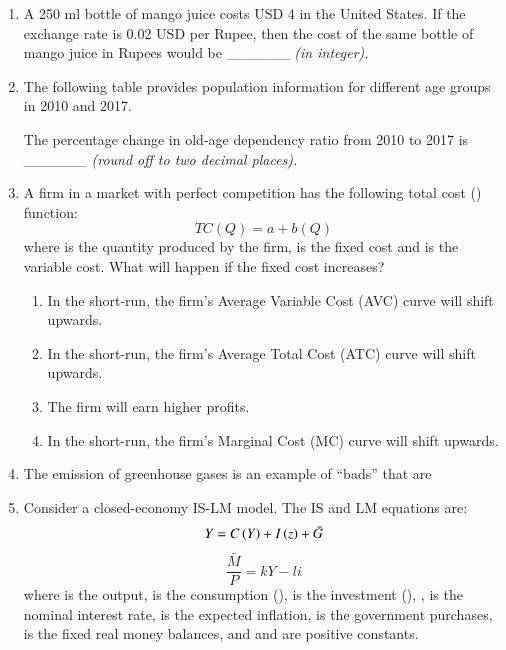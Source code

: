 \documentclass[12pt]{article}
\theoremstyle{remark}
\begin{document}
\begin{enumerate}
\hfill{}
\item A 250 ml bottle of mango juice costs USD 4 in the United States. If the exchange rate is 0.02 USD per Rupee, then the cost of the same bottle of mango juice in Rupees would be \_\_\_\_\_\_ \textit{(in integer).} 
\hfill{}
\item The following table provides population information for different age groups in 2010 and 2017. 
\begin{table}[H]

\end{table}
The percentage change in old-age dependency ratio from 2010 to 2017 is \_\_\_\_\_\_ \textit{(round off to two decimal places).}
\hfill{}
\item A firm in a market with perfect competition has the following total cost () function:
$$
TC(Q) = a + b(Q)
$$
where  is the quantity produced by the firm,  is the fixed cost and  is the variable cost. What will happen if the fixed cost increases? \\
\begin{enumerate} 
\item   In the short-run, the firm’s Average Variable Cost (AVC) curve will shift upwards. 
\item   In the short-run, the firm’s Average Total Cost (ATC) curve will shift upwards. 
\item   The firm will earn higher profits. 
\item   In the short-run, the firm’s Marginal Cost (MC) curve will shift upwards.
\end{enumerate}
\hfill{}
\item   The emission of greenhouse gases is an example of “bads” that are \begin{enumerate}  \end{enumerate}
\hfill{}
\item  Consider a closed-economy IS-LM model. The IS and LM equations are:
$$
Y = C \left(Y\right) + I \left(z\right) + \bar{G}
$$
$$
\frac{\bar{M}}{P} = kY - li
$$
where  is the output,  is the consumption (),  is the investment (), ,  is the nominal interest rate,  is the expected inflation,  is the government purchases,  is the fixed real money balances, and  and  are positive constants. 


\end{enumerate}
\end{document}
